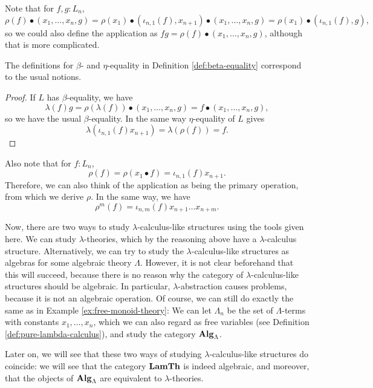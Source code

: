 \begin{remark}
  Note that for $ f, g : L_n $,
  \[
    \rho(f) \bullet (x_1, \dots, x_n, g)
    = \rho(x_1) \bullet (\iota_{n, 1}(f), x_{n + 1}) \bullet (x_1, \dots, x_n, g)
    = \rho(x_1) \bullet (\iota_{n, 1}(f), g),
  \]
  so we could also define the application as $ f g = \rho(f) \bullet (x_1, \dots, x_n, g) $, although that is more complicated.
\end{remark}

\begin{lemma}
  The definitions for $ \beta $- and $ \eta $-equality in Definition \ref{def:beta-equality} correspond to the usual notions.
\end{lemma}
\begin{proof}
  If $ L $ has $ \beta $-equality, we have
  \[ \lambda(f) g = \rho(\lambda(f)) \bullet (x_1, \dots, x_n, g) = f \bullet (x_1, \dots, x_n, g), \]
  so we have the usual $ \beta $-equality. In the same way $ \eta $-equality of $ L $ gives
  \[ \lambda(\iota_{n, 1}(f) x_{n + 1}) = \lambda(\rho(f)) = f. \]
\end{proof}

\begin{remark}
  Also note that for $ f: L_n $,
  \[ \rho(f) = \rho(x_1 \bullet f) = \iota_{n, 1}(f) x_{n + 1}. \]
  Therefore, we can also think of the application as being the primary operation, from which we derive $ \rho $. In the same way, we have
  \[ \rho^m(f) = \iota_{n, m}(f) x_{n + 1} \dots x_{n + m}. \]
\end{remark}

\begin{remark}\label{rem:lambda-theory-or-algebra}
  Now, there are two ways to study $ \lambda $-calculus-like structures using the tools given here. We can study $ \lambda $-theories, which by the reasoning above have a $ \lambda $-calculus structure. Alternatively, we can try to study the $ \lambda $-calculus-like structures as algebras for some algebraic theory $ \Lambda $. However, it is not clear beforehand that this will succeed, because there is no reason why the category of $ \lambda $-calculus-like structures should be algebraic. In particular, $ \lambda $-abstraction causes problems, because it is not an algebraic operation. Of course, we can still do exactly the same as in Example \ref{ex:free-monoid-theory}: We can let $ \Lambda_n $ be the set of $ \Lambda $-terms with constants $ x_1, \dots, x_n $, which we can also regard as free variables (see Definition \ref{def:pure-lambda-calculus}), and study the category $ \mathbf{Alg}_{\Lambda} $.

  Later on, we will see that these two ways of studying $ \lambda $-calculus-like structures do coincide: we will see that the category $ \mathbf{LamTh} $ is indeed algebraic, and moreover, that the objects of $ \mathbf{Alg}_{\Lambda} $ are equivalent to $ \lambda $-theories.
\end{remark}

